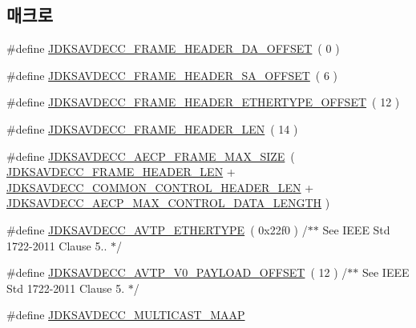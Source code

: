 \subsection*{매크로}
\begin{DoxyCompactItemize}
\item 
\#define \hyperlink{group__pdu_ga1ca97f0df513588adc216b94f3ddea47}{J\+D\+K\+S\+A\+V\+D\+E\+C\+C\+\_\+\+F\+R\+A\+M\+E\+\_\+\+H\+E\+A\+D\+E\+R\+\_\+\+D\+A\+\_\+\+O\+F\+F\+S\+ET}~( 0 )
\item 
\#define \hyperlink{group__pdu_ga43be00bbbe9e273a311c11b048961274}{J\+D\+K\+S\+A\+V\+D\+E\+C\+C\+\_\+\+F\+R\+A\+M\+E\+\_\+\+H\+E\+A\+D\+E\+R\+\_\+\+S\+A\+\_\+\+O\+F\+F\+S\+ET}~( 6 )
\item 
\#define \hyperlink{group__pdu_ga8dde9191880d2dd9f96462655467f90f}{J\+D\+K\+S\+A\+V\+D\+E\+C\+C\+\_\+\+F\+R\+A\+M\+E\+\_\+\+H\+E\+A\+D\+E\+R\+\_\+\+E\+T\+H\+E\+R\+T\+Y\+P\+E\+\_\+\+O\+F\+F\+S\+ET}~( 12 )
\item 
\#define \hyperlink{group__pdu_ga3ef1e0195cb903f2aca0a0a7e9bb5256}{J\+D\+K\+S\+A\+V\+D\+E\+C\+C\+\_\+\+F\+R\+A\+M\+E\+\_\+\+H\+E\+A\+D\+E\+R\+\_\+\+L\+EN}~( 14 )
\item 
\#define \hyperlink{group__pdu_ga504d7a51b28c5f53b3769ec6dfe1bbca}{J\+D\+K\+S\+A\+V\+D\+E\+C\+C\+\_\+\+A\+E\+C\+P\+\_\+\+F\+R\+A\+M\+E\+\_\+\+M\+A\+X\+\_\+\+S\+I\+ZE}~( \hyperlink{group__pdu_ga3ef1e0195cb903f2aca0a0a7e9bb5256}{J\+D\+K\+S\+A\+V\+D\+E\+C\+C\+\_\+\+F\+R\+A\+M\+E\+\_\+\+H\+E\+A\+D\+E\+R\+\_\+\+L\+EN} + \hyperlink{group__jdksavdecc__avtp__common__control__header_gaae84052886fb1bb42f3bc5f85b741dff}{J\+D\+K\+S\+A\+V\+D\+E\+C\+C\+\_\+\+C\+O\+M\+M\+O\+N\+\_\+\+C\+O\+N\+T\+R\+O\+L\+\_\+\+H\+E\+A\+D\+E\+R\+\_\+\+L\+EN} + \hyperlink{group__aecpdu_ga16d6beccf8eb0c78be5562572ded40c5}{J\+D\+K\+S\+A\+V\+D\+E\+C\+C\+\_\+\+A\+E\+C\+P\+\_\+\+M\+A\+X\+\_\+\+C\+O\+N\+T\+R\+O\+L\+\_\+\+D\+A\+T\+A\+\_\+\+L\+E\+N\+G\+TH} )
\item 
\#define \hyperlink{group__pdu_ga9fe7bd6b7d7b0f92f5fdbb910068197f}{J\+D\+K\+S\+A\+V\+D\+E\+C\+C\+\_\+\+A\+V\+T\+P\+\_\+\+E\+T\+H\+E\+R\+T\+Y\+PE}~( 0x22f0 )     /$\ast$$\ast$ See I\+E\+E\+E Std 1722-\/2011 Clause 5.. $\ast$/
\item 
\#define \hyperlink{group__pdu_ga15a1407373dabd26e8903150cc894629}{J\+D\+K\+S\+A\+V\+D\+E\+C\+C\+\_\+\+A\+V\+T\+P\+\_\+\+V0\+\_\+\+P\+A\+Y\+L\+O\+A\+D\+\_\+\+O\+F\+F\+S\+ET}~( 12 ) /$\ast$$\ast$ See I\+E\+EE Std 1722-\/2011 Clause 5. $\ast$/
\item 
\#define \hyperlink{group__pdu_gabb18a7f0144e3a35d9a4faee7485132c}{J\+D\+K\+S\+A\+V\+D\+E\+C\+C\+\_\+\+M\+U\+L\+T\+I\+C\+A\+S\+T\+\_\+\+M\+A\+AP}

\end{DoxyCompactItemize}
